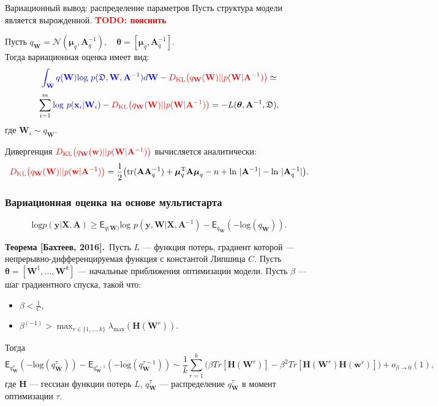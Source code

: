 \documentclass[usenames,dvipsnames,11pt,pdf,utf8,russian,aspectratio=169]{beamer}
\begin{document}
\begin{frame}{Вариационный вывод: распределение параметров}
Пусть структура модели является вырожденной.
\textcolor{red}{\textbf{TODO: пояснить\\}}

Пусть $q_\mathbf{W} = \mathcal{N}(\boldsymbol{\mu}_q, \mathbf{A}^{-1}_q), \quad \boldsymbol{\theta} =  [\boldsymbol{\mu}_q, \mathbf{A}^{-1}_q].$ \\
Тогда вариационная оценка имеет вид:
$$
\textcolor{blue}{\int_{\mathbf{W}} q(\mathbf{W})\text{log}~{p(\mathfrak{D},\mathbf{W},\mathbf{A}^{-1})} d \mathbf{W}} - \textcolor{red}{D_\text{KL}\bigl(q_\mathbf{W} (\mathbf{W} )|| p (\mathbf{W}|\mathbf{A}^{-1})\bigr)} \simeq
$$
$$
\sum_{i=1}^m \textcolor{blue}{\text{log}~p(\mathbf{x}_i | \mathbf{W}_i)} - \textcolor{red}{D_\text{KL}\bigl(q_\mathbf{W} (\mathbf{W} )|| p (\mathbf{W}|\mathbf{A}^{-1})\bigr)} = -L(\boldsymbol{\theta}, \mathbf{A}^{-1}, \mathfrak{D}),
$$
где $\mathbf{W}_i \sim q_\mathbf{W}$.

Дивергенция $\textcolor{red}{D_\text{KL}\bigl(q_\mathbf{W} (\mathbf{w} )|| p (\mathbf{W}|\mathbf{A}^{-1})\bigr)}$ вычисляется аналитически:
$$
\textcolor{red}{D_\text{KL}\bigl(q_\mathbf{W} (\mathbf{W}) || p (\mathbf{w}|\mathbf{A}^{-1})\bigr)} = \frac{1}{2} \bigl( \text{tr} (\mathbf{A}\mathbf{A}^{-1}_q) + \boldsymbol{\mu}_q^\text{T}\mathbf{A}\boldsymbol{\mu}_q - n +\text{ln}~|\mathbf{A}^{-1}| - \text{ln}~|\mathbf{A}^{-1}_q| \bigr).
$$

\end{frame}

\begin{frame}
\frametitle{Вариационная оценка на основе мультистарта}
$$\text{log}p(\mathbf{y}|\mathbf{X}, \mathbf{A}) \geq \mathsf{E}_{q(\mathbf{W)}}\text{log~}p (\mathbf{y}, \mathbf{W}|\mathbf{X}, \mathbf{A}^{-1}) - \mathsf{E}_{q_{\mathbf{W}}}(-\text{log}(q_\mathbf{W})).$$

\textbf{Теорема [Бахтеев, 2016].}~Пусть $L$ --- функция потерь, градиент которой ---  непрерывно-дифференцируемая функция с константой Липшица $C$. Пусть $\boldsymbol{\theta} = [\mathbf{W}^1,\dots,\mathbf{W}^k]$ ---  начальные приближения оптимизации модели. Пусть $\beta$ --- шаг градиентного спуска, такой что:
\begin{itemize}
\item $\beta<\frac{1}{C}$,
\item $\beta^{(-1)} > \max_{r \in \{1,\dots,k\}}\lambda_\text{max} (\mathbf{H}(\mathbf{W}^r))$.
\end{itemize}
Тогда
\small
\[
	\mathsf{E}_{q^{\tau}_{\mathbf{W}}}(-\text{log}(q^{\tau}_\mathbf{W})) -  \mathsf{E}_{q^{\tau-1}_{\mathbf{W}}}(-\text{log}(q^{\tau-1}_\mathbf{W}))  \sim  \frac{1}{k}\sum_{r=1}^k \bigl(\beta Tr[\mathbf{H}(\mathbf{W}^r)] - \beta^2 Tr[\mathbf{H}(\mathbf{W}^r)\mathbf{H}(\mathbf{w}^r)]  \bigr) + o_{\beta \to 0}(1),
\]
где $\mathbf{H}$ --- гессиан функции потерь $L$, $q^{\tau}_\mathbf{W}$ --- распределение $q^{\tau}_\mathbf{W}$ в момент оптимизации $\tau$.
\end{frame}
\end{document}
